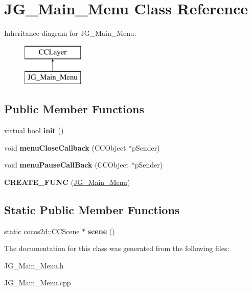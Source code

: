 \hypertarget{class_j_g___main___menu}{\section{J\-G\-\_\-\-Main\-\_\-\-Menu Class Reference}
\label{class_j_g___main___menu}
}
Inheritance diagram for J\-G\-\_\-\-Main\-\_\-\-Menu\-:\begin{figure}[H]
\begin{center}
\leavevmode
\includegraphics[height=2.000000cm]{class_j_g___main___menu}
\end{center}
\end{figure}
\subsection*{Public Member Functions}
\begin{DoxyCompactItemize}
\item 
\hypertarget{class_j_g___main___menu_a93b78909b38318f329a517fd62de1277}{virtual bool {\bfseries init} ()}\label{class_j_g___main___menu_a93b78909b38318f329a517fd62de1277}

\item 
\hypertarget{class_j_g___main___menu_a5bb79dee5a63aeb889c7033b7f0c8074}{void {\bfseries menu\-Close\-Callback} (C\-C\-Object $\ast$p\-Sender)}\label{class_j_g___main___menu_a5bb79dee5a63aeb889c7033b7f0c8074}

\item 
\hypertarget{class_j_g___main___menu_a26e1d7c8a1924315b6e6099da52a30af}{void {\bfseries menu\-Pause\-Call\-Back} (C\-C\-Object $\ast$p\-Sender)}\label{class_j_g___main___menu_a26e1d7c8a1924315b6e6099da52a30af}

\item 
\hypertarget{class_j_g___main___menu_abd196eed8a51b71deb76bd778ad03adf}{{\bfseries C\-R\-E\-A\-T\-E\-\_\-\-F\-U\-N\-C} (\hyperlink{class_j_g___main___menu}{J\-G\-\_\-\-Main\-\_\-\-Menu})}\label{class_j_g___main___menu_abd196eed8a51b71deb76bd778ad03adf}

\end{DoxyCompactItemize}
\subsection*{Static Public Member Functions}
\begin{DoxyCompactItemize}
\item 
\hypertarget{class_j_g___main___menu_a600962585d8d197284ea6ff04a8caca8}{static cocos2d\-::\-C\-C\-Scene $\ast$ {\bfseries scene} ()}\label{class_j_g___main___menu_a600962585d8d197284ea6ff04a8caca8}

\end{DoxyCompactItemize}


The documentation for this class was generated from the following files\-:\begin{DoxyCompactItemize}
\item 
J\-G\-\_\-\-Main\-\_\-\-Menu.\-h\item 
J\-G\-\_\-\-Main\-\_\-\-Menu.\-cpp\end{DoxyCompactItemize}
